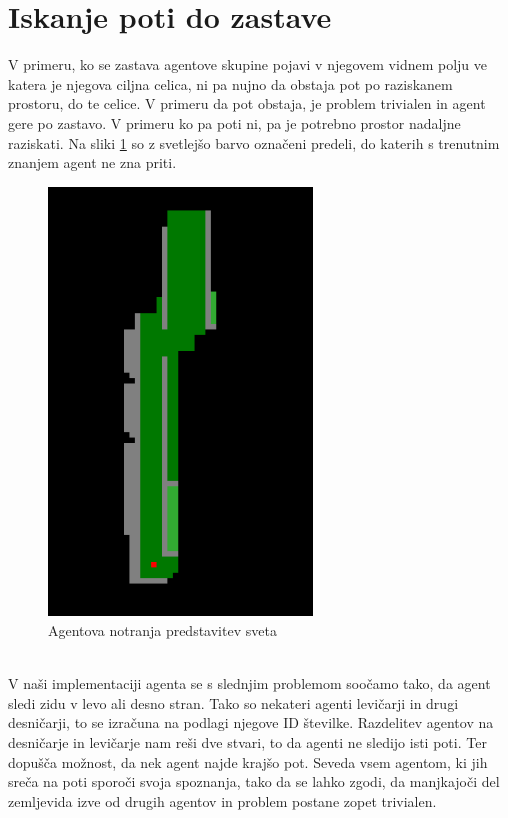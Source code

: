 \documentclass[12pt,a4paper,openany]{book}
\begin{document}
\section{Iskanje poti do zastave}

V primeru, ko se zastava agentove skupine pojavi v njegovem vidnem polju ve katera je njegova ciljna celica, 
ni pa nujno da obstaja pot po raziskanem prostoru, do te celice. V primeru da pot obstaja, je problem trivialen 
in agent gere po zastavo. V primeru ko pa poti ni, pa je potrebno prostor nadaljne raziskati. Na sliki \ref{grupe}
 so z svetlejšo barvo označeni predeli, do katerih s trenutnim znanjem agent ne zna priti.\\
\begin{figure}[ht]
 \centering
 \includegraphics[width=7cm]{./pictures/Grupe.png}
 \caption[Agentova predstavitev sveta]{Agentova notranja predstavitev sveta}
 \label{grupe}
\end{figure}
\\
V naši implementaciji agenta se s slednjim problemom soočamo tako, da agent sledi zidu v levo ali desno stran. 
Tako so nekateri agenti levičarji in drugi desničarji, to se izračuna na podlagi njegove ID številke. Razdelitev 
agentov na desničarje in levičarje nam reši dve stvari, to da agenti ne sledijo isti poti. Ter dopušča možnost, 
da nek agent najde krajšo pot. Seveda vsem agentom, ki jih sreča na poti sporoči svoja spoznanja, tako da se lahko 
zgodi, da manjkajoči del zemljevida izve od drugih agentov in problem postane zopet trivialen.
\end{document}
